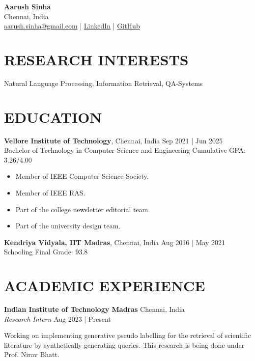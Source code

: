 \documentclass[a4paper,9pt]{extarticle}
\begin{document}
\begin{flushleft}
    \textbf{\LARGE Aarush Sinha}\\[2pt] %
    Chennai, India \\
    \href{mailto:aarush.sinha@gmail.com}{aarush.sinha@gmail.com} | \href{https://www.linkedin.com/in/asj10/}{LinkedIn} | \href{https://github.com/chungimungi}{GitHub} %
\end{flushleft}

\section*{RESEARCH INTERESTS}
\noindent
Natural Language Processing, Information Retrieval, QA-Systems

\section*{EDUCATION}
\noindent
\textbf{Vellore Institute of Technology}, Chennai, India \hfill Sep 2021 | Jun 2025\\ %
Bachelor of Technology in Computer Science and Engineering \hfill Cumulative GPA: 3.26/4.00 \\
\begin{itemize}
    \item Member of IEEE Computer Science Society.
    \item Member of IEEE RAS.
    \item Part of the college newsletter editorial team.
    \item Part of the university design team.
\end{itemize}

\noindent
\textbf{Kendriya Vidyala, IIT Madras}, Chennai, India \hfill Aug 2016 | May 2021\\ %
Schooling \hfill Final Grade: 93.8 %

\section*{ACADEMIC EXPERIENCE}
\noindent
\textbf{Indian Institute of Technology Madras} \hfill Chennai, India\\ %
\textit{Research Intern} \hfill Aug 2023 | Present %

Working on implementing generative pseudo labelling for the retrieval of scientific literature by synthetically generating queries. This research is being done under Prof. Nirav Bhatt.
\end{document}

